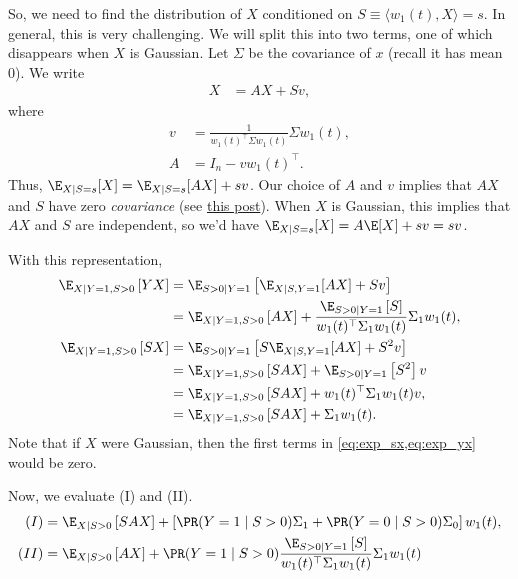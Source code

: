 \documentclass{article}
\begin{document}
So, we need to find the distribution of $X$ conditioned on $S \equiv \langle w_1(t), X \rangle = s$.
In general, this is very challenging.
We will split this into two terms, one of which disappears when $X$ is Gaussian.
Let $\Sigma$ be the covariance of $x$ (recall it has mean 0).
We write
\begin{align}
  X &= AX + S v,
\end{align}
where
\begin{align}
  v &= \frac{1}{ w_1(t)^\top \Sigma w_1(t) } \Sigma w_1(t), \\
  A &= I_n - v w_1(t)^\top.
\end{align}
Thus, $\E_{X \mid S=s}[X] = \E_{X \mid S=s}[AX] + s v$.
Our choice of $A$ and $v$ implies that $AX$ and $S$ have zero \textit{covariance} (see \href{https://math.stackexchange.com/questions/2784531/distribution-of-joint-gaussian-conditional-on-their-sum/2943590#2943590}{this post}).
When $X$ is Gaussian, this implies that $AX$ and $S$ are independent, so we'd have $\E_{X \mid S=s}[X] = A \E[X] + s v = s v$.

With this representation,
\begin{align}
  \E_{X \mid Y=1, S>0} \left[ YX \right] 
  &= \E_{S>0 \mid Y=1} \left[ \E_{X \mid S, Y=1}[AX] + S v \right] \\
  &= \E_{X \mid Y=1, S>0} \left[ AX \right] + \frac{ \E_{S>0 \mid Y=1} \left[ S \right] }{ w_1(t)^\top \Sigma_1 w_1(t) } \Sigma_1 w_1(t), \label{eq:exp_yx} \\
  \E_{X \mid Y=1, S>0} \left[ S X \right] 
  &= \E_{S>0 \mid Y=1} \left[ S \E_{X \mid S, Y=1}[AX] + S^2 v \right] \\
  &= \E_{X \mid Y=1, S>0} \left[ S AX \right] + \E_{S>0 \mid Y=1} \left[ S^2 \right] v \\
  &= \E_{X \mid Y=1, S>0} \left[ S AX \right] + w_1(t)^\top \Sigma_1 w_1(t) v, \\
  &= \E_{X \mid Y=1, S>0} \left[ S AX \right] + \Sigma_1 w_1(t). \label{eq:exp_sx}
\end{align}
Note that if $X$ were Gaussian, then the first terms in \cref{eq:exp_sx,eq:exp_yx} would be zero.

Now, we evaluate (I) and (II).
\begin{align}
  (I) &= \E_{X \mid S>0} \left[ S AX \right] + \left[ \PR(Y=1 \mid S>0) \Sigma_1 + \PR(Y=0 \mid S>0) \Sigma_0 \right] w_1(t), \\
  (II) &= \E_{X \mid S>0} \left[ AX \right] + \PR(Y=1 \mid S>0) \frac{ \E_{S>0 \mid Y=1} \left[ S \right] }{ w_1(t)^\top \Sigma_1 w_1(t) } \Sigma_1 w_1(t)
\end{align}
\end{document}
